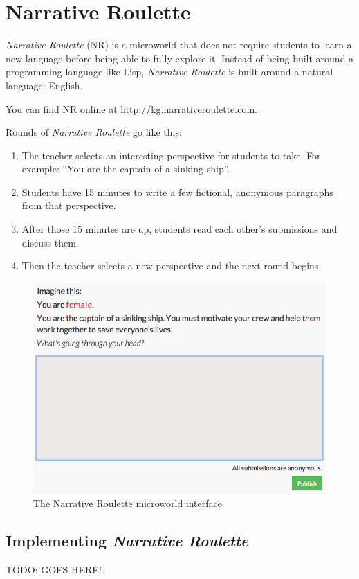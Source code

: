 \section{Narrative Roulette}

\emph{Narrative Roulette} (NR) is a microworld that does not require
students to learn a new language before being able to fully explore it.
Instead of being built around a programming language like Lisp,
\emph{Narrative Roulette} is built around a natural language: English.

You can find NR online at \url{http://kg.narrativeroulette.com}.

Rounds of \emph{Narrative Roulette} go like this: 

\begin{enumerate}
\item The teacher selects an interesting perspective for students to take. For example:
``You are the captain of a sinking ship''. 
\item Students have 15 minutes to write a few fictional, anonymous paragraphs from that perspective. 
\item After those 15 minutes are up, students read each other's
submissions and discuss them.
\item Then the teacher selects a new perspective and the next round begins. 
\end{enumerate}

\begin{figure}[ht!]
\centering
\includegraphics[width=115mm]{img/narrative_editor.png}
\caption{The Narrative Roulette microworld interface}
\label{overflow}
\end{figure}

\subsection{Implementing \textit{Narrative Roulette}}
TODO: GOES HERE!

